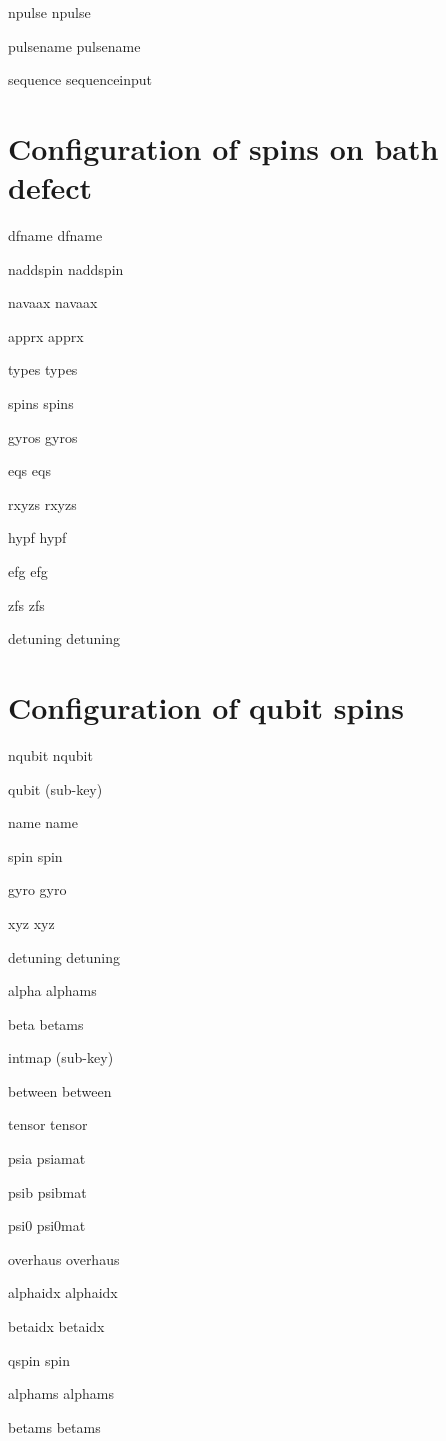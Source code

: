 \begin{DoxyItemize}
\item npulse npulse
\item pulsename pulsename
\item sequence sequenceinput
\end{DoxyItemize}\hypertarget{TagVariable_IN_DEFECTARR}{}\section{Configuration of spins on bath defect}\label{TagVariable_IN_DEFECTARR}

\begin{DoxyItemize}
\item dfname dfname
\item naddspin naddspin
\item navaax navaax
\item apprx apprx
\item types types
\item spins spins
\item gyros gyros
\item eqs eqs
\item rxyzs rxyzs
\item hypf hypf
\item efg efg
\item zfs zfs
\item detuning detuning
\end{DoxyItemize}\hypertarget{TagVariable_IN_QUBITARR}{}\section{Configuration of qubit spins}\label{TagVariable_IN_QUBITARR}

\begin{DoxyItemize}
\item nqubit nqubit
\item qubit (sub-\/key)
\item name name
\item spin spin
\item gyro gyro
\item xyz xyz
\item detuning detuning
\item alpha alphams
\item beta betams
\item intmap (sub-\/key)
\item between between
\item tensor tensor
\item psia psiamat
\item psib psibmat
\item psi0 psi0mat
\item overhaus overhaus
\item alphaidx alphaidx
\item betaidx betaidx
\item qspin spin
\item alphams alphams
\item betams betams 
\end{DoxyItemize}